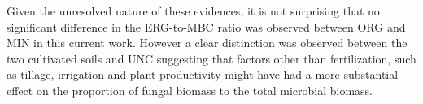 	Given the unresolved nature of these evidences, it is not surprising that no significant difference in the ERG-to-MBC ratio was observed between ORG and MIN in this current work. However a clear distinction was observed between the two cultivated soils and UNC suggesting that factors other than fertilization, such as tillage, irrigation and plant productivity might have had a more substantial effect on the proportion of fungal biomass to the total microbial biomass.

